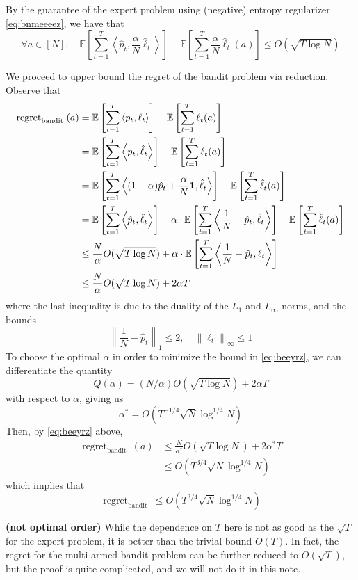 \documentclass{article}
\newcommand{\bfs}[1]{\textbf{({#1}) }}
\newcommand{\re}{\operatorname{regret}}
\begin{document}
By the guarantee of the expert problem using (negative) entropy regularizer \cref{eq:bnmeeeez}, we have that
$$
\forall a \in[N], \quad \mathbb{E}\left[\sum_{t=1}^{T}\left\langle\hat{p}_{t}, \frac{\alpha}{N} \hat{\ell}_{t}\right\rangle\right]-\mathbb{E}\left[\sum_{t=1}^{T} \frac{\alpha}{N} \hat{\ell}_{t}(a)\right] \leq O(\sqrt{T \log N})
$$

We proceed to upper bound the regret of the bandit problem via reduction. Observe that
\begin{align}
\operatorname{regret}_{\text {bandit }}(a) &=\mathbb{E}\left[\sum_{t=1}^{T}\left\langle p_{t}, \ell_{t}\right\rangle\right]-\mathbb{E}\left[\sum_{t=1}^{T} \ell_{t}(a)\right] \nonumber\\ 
&=\mathbb{E}\left[\sum_{t=1}^{T}\left\langle p_{t}, \hat{\ell}_{t}\right\rangle\right]-\mathbb{E}\left[\sum_{t=1}^{T} \ell_{t}(a)\right] \nonumber\\ 
&=\mathbb{E}\left[\sum_{t=1}^{T}\left\langle(1-\alpha) \hat{p}_{t}+\frac{\alpha}{N} \mathbf{1}, \hat{\ell}_{t}\right\rangle\right]-\mathbb{E}\left[\sum_{t=1}^{T} \hat{\ell}_{t}(a)\right] \nonumber\\ 
&=\mathbb{E}\left[\sum_{t=1}^{T}\left\langle\hat{p}_{t}, \hat{\ell}_{t}\right\rangle\right]+\alpha \cdot \mathbb{E}\left[\sum_{t=1}^{T}\left\langle\frac{1}{N}-\hat{p}_{t}, \hat{\ell}_{t}\right\rangle\right]-\mathbb{E}\left[\sum_{t=1}^{T} \hat{\ell}_{t}(a)\right] \nonumber\\ 
& \leq \frac{N}{\alpha} O(\sqrt{T \log N})+\alpha \cdot \mathbb{E}\left[\sum_{t=1}^{T}\left\langle\frac{1}{N}-\hat{p}_{t}, \ell_{t}\right\rangle\right] \nonumber\\ 
& \leq \frac{N}{\alpha} O(\sqrt{T \log N})+2 \alpha T\label{eq:beeyrz}
\end{align}
where the last inequality is due to the duality of the $L_{1}$ and $L_{\infty}$ norms, and the bounds
$$
\left\|\frac{1}{N}-\hat{p}_{t}\right\|_{1} \leq 2, \quad\left\|\ell_{t}\right\|_{\infty} \leq 1
$$
To choose the optimal $\alpha$ in order to minimize the bound in \cref{eq:beeyrz}, we can differentiate the quantity
$$
Q(\alpha)=(N / \alpha) O(\sqrt{T \log N})+2 \alpha T
$$
with respect to $\alpha$, giving us
$$
\alpha^{*}=O\left(T^{-1 / 4} \sqrt{N} \log ^{1 / 4} N\right)
$$
Then, by \cref{eq:beeyrz} above,
$$
\begin{aligned}
\operatorname{regret}_{\text {bandit }}(a) & \leq \frac{N}{\alpha^{*}} O(\sqrt{T \log N})+2 \alpha^{*} T \\
& \leq O\left(T^{3 / 4} \sqrt{N} \log ^{1 / 4} N\right)
\end{aligned}
$$
which implies that
$$
\re_{\text {bandit }} \leq O\left(T^{3 / 4} \sqrt{N} \log ^{1 / 4} N\right)
$$
\begin{rema}\bfs{not optimal order}
 While the dependence on $T$ here is not as good as the $\sqrt{T}$ for the expert problem, it is better than the trivial bound $O(T)$. In fact, the regret for the multi-armed bandit problem can be further reduced to $O(\sqrt{T})$, but the proof is quite complicated, and we will not do it in this note.
\end{rema}
\end{document}

